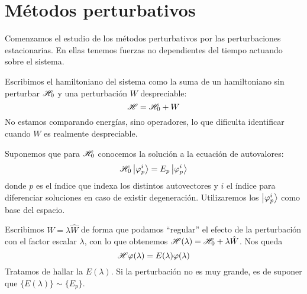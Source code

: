 \chapter{Métodos perturbativos}
Comenzamos el estudio de los métodos perturbativos por las
perturbaciones estacionarias. En ellas tenemos fuerzas no dependientes
del tiempo actuando sobre el sistema.

Escribimos el hamiltoniano del sistema como la suma de un hamiltoniano
sin perturbar $ \mathscr{H} _0$ y una perturbación $W$ despreciable:
\begin{equation}
   \mathscr{H}  =  \mathscr{H} _0 + W 
\end{equation}
No estamos comparando energías, sino operadores, lo que dificulta
identificar cuando $W$ es realmente despreciable.

Suponemos que para $ \mathscr{H} _0$ conocemos la solución a la ecuación de
autovalores:
\begin{equation}
   \mathscr{H} _0 \ket{\varphi_p^i} = E_p \ket{\varphi_p^i}
\label{eq:originalH}
\end{equation}
donde $p$ es el índice que indexa los distintos autovectores y $i$ el
índice para diferenciar soluciones en caso de existir degeneración.
Utilizaremos los $\ket{\varphi_p^i}$ como base del espacio.

Escribimos $W=\lambda \hat{W}$ de forma que podamos ``regular'' el
efecto de la perturbación con el factor escalar $\lambda$, con lo que
obtenemos $ \mathscr{H} (\lambda) =  \mathscr{H} _0 + \lambda\hat{W} $.
Nos queda
\begin{equation}
   \mathscr{H}  \varphi(\lambda) = E(\lambda)\varphi(\lambda)
\label{eq:lambdaschr}
\end{equation}
Tratamos de hallar la $E(\lambda)$. Si la perturbación no es muy
grande, es de suponer que $\{E(\lambda)\} \sim \{E_p\}$. 

